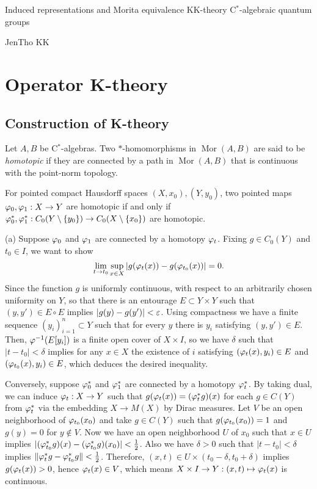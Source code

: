 \documentclass{../../large}
\DeclareMathOperator{\Mor}{Mor}
\begin{document}
Induced representations and Morita equivalence
KK-theory
C$^*$-algebraic quantum groups

JenTho KK


\chapter{Operator K-theory}
\section{Construction of K-theory}

\begin{prb}
Let $A,B$ be C$^*$-algebras.
Two $*$-homomorphisms in $\Mor(A,B)$ are said to be \emph{homotopic} if they are connected by a path in $\Mor(A,B)$ that is continuous with the point-norm topology.
\begin{parts}
\item For pointed compact Hausdorff spaces $(X,x_0),(Y,y_0)$, two pointed maps $\varphi_0,\varphi_1:X\to Y$ are homotopic if and only if $\varphi_0^*,\varphi_1^*:C_0(Y\setminus\{y_0\})\to C_0(X\setminus\{x_0\})$ are homotopic.
\end{parts}
\end{prb}
\begin{pf}
(a)
Suppose $\varphi_0$ and $\varphi_1$ are connected by a homotopy $\varphi_t$.
Fixing $g\in C_0(Y)$ and $t_0\in I$, we want to show
\[\lim_{t\to t_0}\sup_{x\in X}|g(\varphi_t(x))-g(\varphi_{t_0}(x))|=0.\]
Since the function $g$ is uniformly continuous, with respect to an arbitrarily chosen uniformity on $Y$, so that there is an entourage $E\subset Y\times Y$ such that $(y,y')\in E\circ E$ implies $|g(y)-g(y')|<\varepsilon$.
Using compactness we have a finite sequence $(y_i)_{i=1}^n\subset Y$ such that for every $y$ there is $y_i$ satisfying $(y,y')\in E$.
Then, $\varphi^{-1}(E[y_i])$ is a finite open cover of $X\times I$, so we have $\delta$ such that $|t-t_0|<\delta$ implies for any $x\in X$ the existence of $i$ satisfying $(\varphi_t(x),y_i)\in E$ and $(\varphi_{t_0}(x),y_i)\in E$, which deduces the desired inequality.

Conversely, suppose $\varphi_0^*$ and $\varphi_1^*$ are connected by a homotopy $\varphi_t^*$.
By taking dual, we can induce $\varphi_t:X\to Y$ such that $g(\varphi_t(x))=(\varphi_t^*g)(x)$ for each $g\in C(Y)$ from $\varphi_t^*$ via the embedding $X\to M(X)$ by Dirac measures.
Let $V$ be an open neighborhood of $\varphi_{t_0}(x_0)$ and take $g\in C(Y)$ such that $g(\varphi_{t_0}(x_0))=1$ and $g(y)=0$ for $y\notin V$.
Now we have an open neighborhood $U$ of $x_0$ such that $x\in U$ implies $|(\varphi_{t_0}^*g)(x)-(\varphi_{t_0}^*g)(x_0)|<\frac12$.
Also we have $\delta>0$ such that $|t-t_0|<\delta$ implies $\|\varphi_t^*g-\varphi_{t_0}^*g\|<\frac12$.
Therefore, $(x,t)\in U\times(t_0-\delta,t_0+\delta)$ implies $g(\varphi_t(x))>0$, hence $\varphi_t(x)\in V$, which means $X\times I\to Y:(x,t)\mapsto\varphi_t(x)$ is continuous.
\end{pf}
\end{document}
